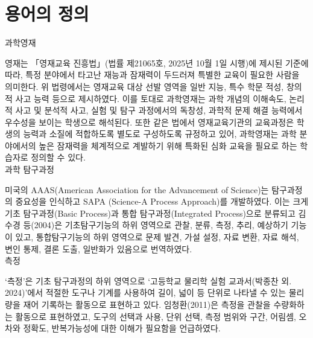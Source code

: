 \section{용어의 정의}
\ganadareset

\ganada 과학영재

영재는 「영재교육 진흥법」(법률 제21065호, 2025년 10월 1일 시행)에 제시된 기준에 따라,
특정 분야에서 타고난 재능과 잠재력이 두드러져 특별한 교육이 필요한 사람을 의미한다.
%
위 법령에서는 영재교육 대상 선발 영역을 일반 지능, 특수 학문 적성, 창의적 사고 능력 등으로 제시하였다.
%
이를 토대로 과학영재는 과학 개념의 이해속도, 논리적 사고 및 분석적 사고,
실험 및 탐구 과정에서의 독창성, 과학적 문제 해결 능력에서 우수성을 보이는 학생으로 해석된다.
%
또한 같은 법에서 영재교육기관의 교육과정은 학생의 능력과 소질에 적합하도록
별도로 구성하도록 규정하고 있어, 과학영재는 과학 분야에서의 높은 잠재력을 체계적으로 계발하기 위해
특화된 심화 교육을 필요로 하는 학습자로 정의할 수 있다. \\

\ganada 과학 탐구과정

미국의 AAAS(American Association for the Advancement of Science)는
탐구과정의 중요성을 인식하고 SAPA (Science-A Process Approach)를 개발하였다.
이는 크게 기초 탐구과정(Basic Process)과 통합 탐구과정(Integrated Process)으로 분류되고
김수경 등(2004)은 기초탐구기능의 하위 영역으로 관찰, 분류, 측정, 추리, 예상하기 기능이 있고,
통합탐구기능의 하위 영역으로 문제 발견, 가설 설정, 자료 변환, 자료 해석, 변인 통제, 결론 도출, 일반화가
있음으로 번역하였다. \\

\ganada 측정

`측정'은 기초 탐구과정의 하위 영역으로
`고등학교 물리학 실험 교과서(박종찬 외. 2024)'에서 적절한 도구나 기계를 사용하여 길이, 넓이 등
단위로 나타낼 수 있는 물리량을 재어 기록하는 활동으로 표현하고 있다.
%
임청환(2011)은 측정을 관찰을 수량화하는 활동으로 표현하였고,
도구의 선택과 사용, 단위 선택, 측정 범위와 구간, 어림셈, 오차와 정확도, 반복가능성에 대한 이해가
필요함을 언급하였다. \\

